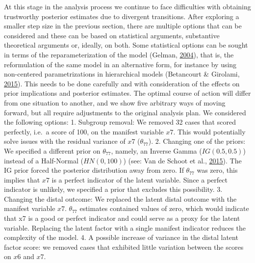 \documentclass[openright,titlepage,12pt,a4paper]{book}
\begin{document}
At this stage in the analysis process we continue to face difficulties with obtaining trustworthy posterior estimates due to divergent transitions. After exploring a smaller step size in the previous section, there are multiple options that can be considered and these can be based on statistical arguments, substantive theoretical arguments or, ideally, on both. Some statistical options can be sought in terms of the reparameterization of the model (Gelman, \protect\hyperlink{ref-gelman_parameterization_2004}{2004}), that is, the reformulation of the same model in an alternative form, for instance by using non-centered parametrizations in hierarchical models (Betancourt \& Girolami, \protect\hyperlink{ref-betancourt_hamiltonian_2015}{2015}). This needs to be done carefully and with consideration of the effects on prior implications and posterior estimates. The optimal course of action will differ from one situation to another, and we show five arbitrary ways of moving forward, but all require adjustments to the original analysis plan. We considered the following options:
1. Subgroup removal: We removed 32 cases that scored perfectly, i.e.~a score of 100, on the manifest variable \(x7\). This would potentially solve issues with the residual variance of \(x7\) (\(\theta_{77}\)).
2. Changing one of the priors: We specified a different prior on \(\theta_{77}\), namely, an Inverse Gamma (\(IG(0.5,0.5)\)) instead of a Half-Normal (\(HN(0,100)\)) (see: Van de Schoot et al., \protect\hyperlink{ref-van_de_schoot_analyzing_2015}{2015}). The IG prior forced the posterior distribution away from zero. If \(\theta_{77}\) was zero, this implies that \(x7\) is a perfect indicator of the latent variable. Since a perfect indicator is unlikely, we specified a prior that excludes this possibility.
3. Changing the distal outcome: We replaced the latent distal outcome with the manifest variable \(x7\). \(\theta_{77}\) estimates contained values of zero, which would indicate that x7 is a good or perfect indicator and could serve as a proxy for the latent variable. Replacing the latent factor with a single manifest indicator reduces the complexity of the model.
4. A possible increase of variance in the distal latent factor score: we removed cases that exhibited little variation between the scores on \(x6\) and \(x7\).
\end{document}

